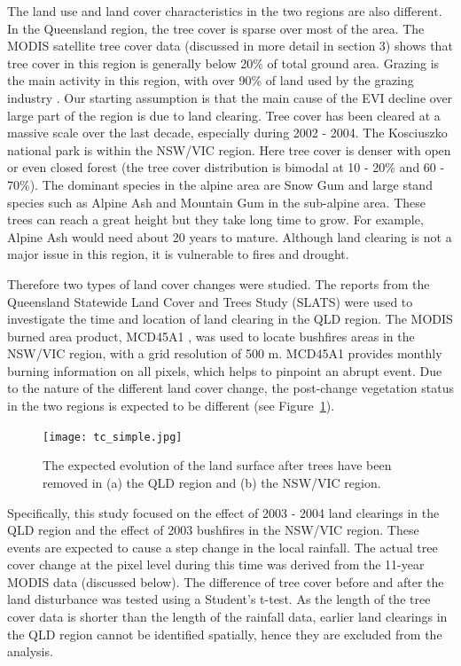\documentclass[draft,linenumbers]{agujournal}
\begin{document}
\begin{article}
The land use and land cover characteristics in the two regions are also different. In the Queensland region, the tree cover is sparse over most of the area. The MODIS satellite tree cover data (discussed in more detail in section 3) shows that tree cover in this region is generally below 20\% of total ground area. Grazing is the main activity in this region, with over 90\% of land used by the grazing industry \citep{ABARES2010}. Our starting assumption is that the main cause of the EVI  decline over large part of the region is due to land clearing. Tree cover has been cleared at a massive scale over the last decade, especially during 2002 - 2004. The Kosciuszko national park is within the NSW/VIC region. Here tree cover is denser with open or even closed forest (the tree cover distribution is bimodal at 10 - 20\% and 60 - 70\%). The dominant species in the alpine area are Snow Gum and large stand species such as Alpine Ash and Mountain Gum in the sub-alpine area. These trees can reach a great height but they take long time to grow. For example, Alpine Ash would need about 20 years to mature. Although land clearing is not a major issue in this region, it is vulnerable to fires and drought. 

Therefore two types of land cover changes were studied. The reports from the Queensland Statewide Land Cover and Trees Study (SLATS) \citep[e.g.][]{SLATS2001,SLATS2003} were used to investigate the time and location of land clearing in the QLD region. The MODIS burned area product, MCD45A1 \citep{Roy2002,Roy2005,Roy2008}, was used to locate bushfires areas in the NSW/VIC region, with a grid resolution of 500 m. MCD45A1 provides monthly burning information on all pixels, which helps to pinpoint an abrupt event. Due to the nature of the different land cover change, the post-change vegetation status in the two regions is expected to be different (see Figure~\ref{fig:tc_simple}). 

\begin{figure}[htp]
  \centering
  \texttt{[image: tc\_simple.jpg]} 
  \caption{The expected evolution of the land surface after trees have been removed in (a) the QLD region and (b) the NSW/VIC region.}
  \label{fig:tc_simple}
\end{figure}




Specifically, this study focused on the effect of 2003 - 2004 land clearings in the QLD region and the effect of 2003 bushfires in the NSW/VIC region. These events are expected to cause a step change in the local rainfall. The actual tree cover change at the pixel level during this time was derived from the 11-year MODIS data (discussed below). The difference of tree cover before and after the land disturbance was tested using a Student's t-test. As the length of the tree cover data is shorter than the length of the rainfall data, earlier land clearings in the QLD region cannot be identified spatially, hence they are excluded from the analysis.


\end{article}
\end{document}
